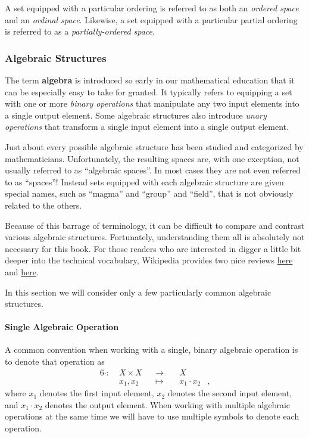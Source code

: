 \documentclass[
  letterpaper,
  DIV=11,
  numbers=noendperiod]{scrartcl}
\let\oldparagraph\paragraph
\renewcommand{\paragraph}[1]{\oldparagraph{#1}\mbox{}}
\begin{document}
A set equipped with a particular ordering is referred to as both an
\emph{ordered space} and an \emph{ordinal space}. Likewise, a set
equipped with a particular partial ordering is referred to as a
\emph{partially-ordered space}.

\subsubsection{Algebraic Structures}\label{algebraic-structures}

The term \textbf{algebra} is introduced so early in our mathematical
education that it can be especially easy to take for granted. It
typically refers to equipping a set with one or more \emph{binary
operations} that manipulate any two input elements into a single output
element. Some algebraic structures also introduce \emph{unary
operations} that transform a single input element into a single output
element.

Just about every possible algebraic structure has been studied and
categorized by mathematicians. Unfortunately, the resulting spaces are,
with one exception, not usually referred to as ``algebraic spaces''. In
most cases they are not even referred to as ``spaces''! Instead sets
equipped with each algebraic structure are given special names, such as
``magma'' and ``group'' and ``field'', that is not obviously related to
the others.

Because of this barrage of terminology, it can be difficult to compare
and contrast various algebraic structures. Fortunately, understanding
them all is absolutely not necessary for this book. For those readers
who are interested in digger a little bit deeper into the technical
vocabulary, Wikipedia provides two nice reviews
\href{https://en.wikipedia.org/wiki/Algebraic_structure\#Common_algebraic_structures}{here}
and
\href{https://en.wikipedia.org/wiki/Outline_of_algebraic_structures\#Types_of_algebraic_structures}{here}.

In this section we will consider only a few particularly common
algebraic structures.

\paragraph{Single Algebraic Operation}\label{single-algebraic-operation}

A common convention when working with a single, binary algebraic
operation is to denote that operation as \begin{alignat*}{6}
\cdot :\; & X \times X& &\rightarrow& \; & X &
\\
& x_{1}, x_{2} & &\mapsto& & x_{1} \cdot x_{2} &,
\end{alignat*} where \(x_{1}\) denotes the first input element,
\(x_{2}\) denotes the second input element, and \(x_{1} \cdot x_{2}\)
denotes the output element. When working with multiple algebraic
operations at the same time we will have to use multiple symbols to
denote each operation.
\end{document}
